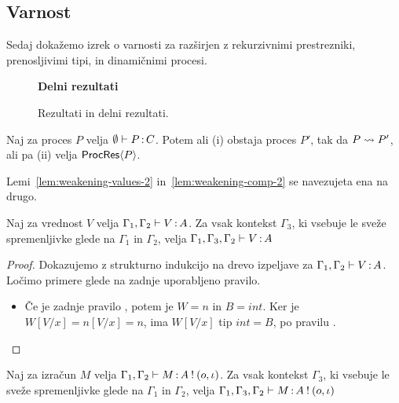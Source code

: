 \subsection{Varnost}

Sedaj dokažemo izrek o varnosti za \lae{} razširjen z rekurzivnimi prestrezniki, prenosljivimi tipi, in dinamičnimi procesi.


\begin{figure}[H]
	\centering
	
	\textbf{Delni rezultati}
	\begin{mathpar}
	\end{mathpar}
	

	\caption{Rezultati in delni rezultati.}
	\label{fig:results-rules}
\end{figure}


\begin{izrek}[o napredku]
	Naj za proces $P$ velja $\emptyset \types P \of C$. Potem ali (i) obstaja proces $P'$, tak da $P \reduces P'$, ali pa (ii) velja $\ProcResult{P}$.
\end{izrek}

Lemi~\ref{lem:weakening-values-2} in~\ref{lem:weakening-comp-2} se navezujeta ena na drugo.

\begin{lema}\label{lem:weakening-values-2}
	Naj za vrednost $V$ velja $\Gamma_1, \Gamma_2 \types V \of A$. Za vsak kontekst $\Gamma_3$, ki vsebuje le sveže spremenljivke glede na $\Gamma_1$ in $\Gamma_2$, velja $\Gamma_1, \Gamma_3, \Gamma_2 \types V \of A$
\end{lema}

\begin{proof}
	Dokazujemo z strukturno indukcijo na drevo izpeljave za $\Gamma_1, \Gamma_2 \types V \of A$.
	Ločimo primere glede na zadnje uporabljeno pravilo.
	
	\begin{itemize}
		\item Če je zadnje pravilo , potem je $W=n$ in $B=int$. Ker je $W[V/x] = n[V/x] = n$, ima $W[V/x]$ tip $int = B$, po pravilu .
	\end{itemize}
\end{proof}

\begin{lema}\label{lem:weakening-comp-2}
	Naj za izračun $M$ velja $\Gamma_1, \Gamma_2 \types M \of \tycomp{A}{\o, \i}$. Za vsak kontekst $\Gamma_3$, ki vsebuje le sveže spremenljivke glede na $\Gamma_1$ in $\Gamma_2$, velja $\Gamma_1, \Gamma_3, \Gamma_2 \types M \of \tycomp{A}{\o, \i}$
\end{lema}

